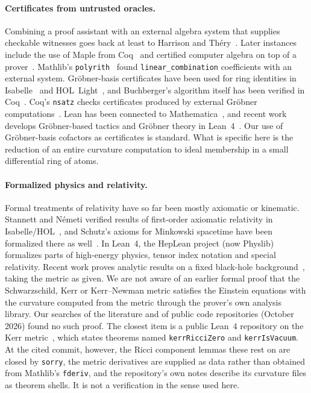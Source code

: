 \documentclass[11pt]{article}
\theoremstyle{definition}
\theoremstyle{remark}
\newcommand{\lean}[1]{\lstinline[basicstyle=\ttfamily\normalsize,columns=fullflexible,breaklines=false]{#1}}
\begin{document}
\paragraph{Certificates from untrusted oracles.}
Combining a proof assistant with an external algebra system that supplies checkable witnesses goes back at least to Harrison and Th\'ery~\cite{harrison1998}.
Later instances include the use of Maple from Coq~\cite{delahaye2005} and certified computer algebra on top of a prover~\cite{kaliszyk2007}.
Mathlib's \lean{polyrith}~\cite{mathlib_polyrith} found \lean{linear_combination} coefficients with an external system. Gr\"obner-basis certificates have been used for ring identities in Isabelle~\cite{chaieb2007} and HOL~Light~\cite{harrison2007}, and Buchberger's algorithm itself has been verified in Coq~\cite{thery2001}. Coq's \texttt{nsatz} checks certificates produced by external Gr\"obner computations~\cite{pottier2010}. Lean has been connected to Mathematica~\cite{lewis2022}, and recent work develops Gr\"obner-based tactics and Gr\"obner theory in Lean~4~\cite{shen2026tactics,guo2026groebner}.
Our use of Gr\"obner-basis cofactors as certificates is standard.
What is specific here is the reduction of an entire curvature computation to ideal membership in a small differential ring of atoms.

\paragraph{Formalized physics and relativity.}
Formal treatments of relativity have so far been mostly axiomatic or kinematic. Stannett and N\'emeti verified results of first-order axiomatic relativity in Isabelle/HOL~\cite{stannett2014}, and Schutz's axioms for Minkowski spacetime have been formalized there as well~\cite{schmoetten2021}. In Lean~4, the HepLean project (now Physlib)~\cite{toobysmith2025heplean,toobysmith2024index,physlib} formalizes parts of high-energy physics, tensor index notation and special relativity. Recent work proves analytic results on a fixed black-hole background~\cite{kehle2026rn}, taking the metric as given. We are not aware of an earlier formal proof that the Schwarzschild, Kerr or Kerr--Newman metric satisfies the Einstein equations with the curvature computed from the metric through the prover's own analysis library. Our searches of the literature and of public code repositories (October 2026) found no such proof. The closest item is a public Lean~4 repository on the Kerr metric~\cite{kerrformalization2026}, which states theorems named \texttt{kerrRicciZero} and \texttt{kerrIsVacuum}. At the cited commit, however, the Ricci component lemmas these rest on are closed by \lean{sorry}, the metric derivatives are supplied as data rather than obtained from Mathlib's \lean{fderiv}, and the repository's own notes describe its curvature files as theorem shells. It is not a verification in the sense used here.
\end{document}
